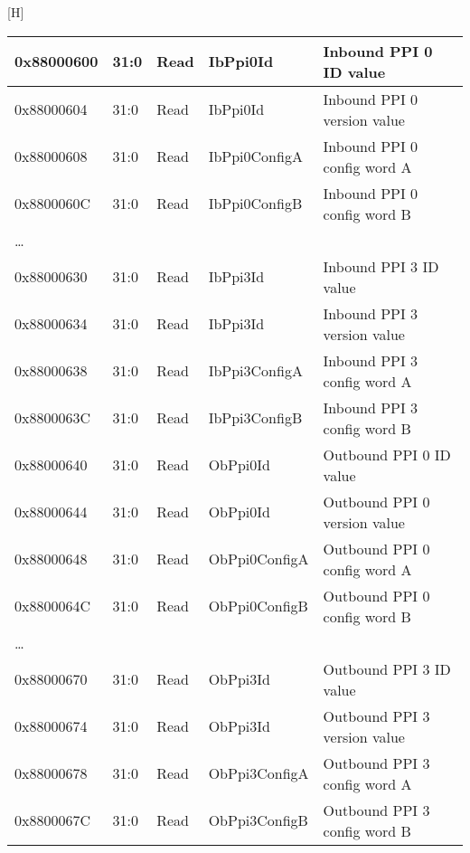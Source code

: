 \documentclass[11pt]{article}
\begin{document}
\begin{center}[H]
\begin{longtable}{| l | l | l | l | l | }
      \hline 0x88000600              & 31:0  & Read  & IbPpi0Id             & Inbound PPI 0 ID value                         \\
      \hline 0x88000604              & 31:0  & Read  & IbPpi0Id             & Inbound PPI 0 version value                      \\
      \hline 0x88000608              & 31:0  & Read  & IbPpi0ConfigA        & Inbound PPI 0 config word A              \\
      \hline 0x8800060C              & 31:0  & Read  & IbPpi0ConfigB        & Inbound PPI 0 config word B              \\
             \ldots                  &       &       &                      &                                                \\
      \hline 0x88000630              & 31:0  & Read  & IbPpi3Id             & Inbound PPI 3 ID value                         \\
      \hline 0x88000634              & 31:0  & Read  & IbPpi3Id             & Inbound PPI 3 version value                      \\
      \hline 0x88000638              & 31:0  & Read  & IbPpi3ConfigA        & Inbound PPI 3 config word A              \\
      \hline 0x8800063C              & 31:0  & Read  & IbPpi3ConfigB        & Inbound PPI 3 config word B              \\
      \hline 0x88000640              & 31:0  & Read  & ObPpi0Id             & Outbound PPI 0 ID value                         \\
      \hline 0x88000644              & 31:0  & Read  & ObPpi0Id             & Outbound PPI 0 version value                      \\
      \hline 0x88000648              & 31:0  & Read  & ObPpi0ConfigA        & Outbound PPI 0 config word A              \\
      \hline 0x8800064C              & 31:0  & Read  & ObPpi0ConfigB        & Outbound PPI 0 config word B              \\
             \ldots                  &       &       &                      &                                                \\
      \hline 0x88000670              & 31:0  & Read  & ObPpi3Id             & Outbound PPI 3 ID value                         \\
      \hline 0x88000674              & 31:0  & Read  & ObPpi3Id             & Outbound PPI 3 version value                      \\
      \hline 0x88000678              & 31:0  & Read  & ObPpi3ConfigA        & Outbound PPI 3 config word A              \\
      \hline 0x8800067C              & 31:0  & Read  & ObPpi3ConfigB        & Outbound PPI 3 config word B              \\
      \hline
   \end{longtable}
   \label{tab:dma_addr}
\end{center}
\end{document}
